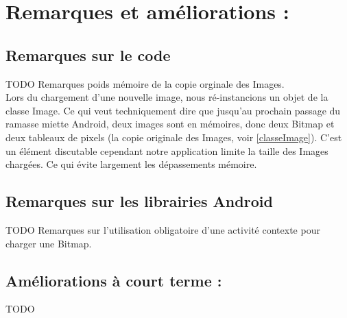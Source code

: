 \section{Remarques et améliorations  :}

\subsection{Remarques sur le code}
TODO Remarques poids mémoire de la copie orginale des Images.
\\

Lors du chargement d'une nouvelle image, nous ré-instancions un objet de la classe Image. Ce qui veut techniquement dire que jusqu'au prochain passage du ramasse miette Android, deux images sont en mémoires, donc deux Bitmap et deux tableaux de pixels (la copie originale des Images, voir \ref{classeImage}). C'est un élément discutable cependant notre application limite la taille des Images chargées. Ce qui évite largement les dépassements mémoire.

\subsection{Remarques sur les librairies Android}
TODO Remarques sur l'utilisation obligatoire d'une activité contexte pour charger une Bitmap.

\subsection{Améliorations à court terme :}
TODO
